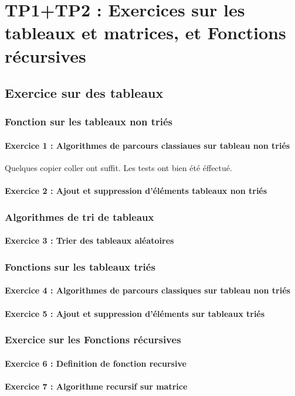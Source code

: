 \chapter{TP1+TP2 : Exercices sur les tableaux et matrices, et Fonctions récursives}
    \section{Exercice sur des tableaux}
        \subsection{Fonction sur les tableaux non triés}
            \subsubsection{Exercice 1 : Algorithmes de parcours classiaues sur tableau non triés}
	        Quelques copier coller ont suffit.
                Les tests ont bien été éffectué.
            \subsubsection{Exercice 2 : Ajout et suppression d'éléments tableaux non triés}
        \subsection{Algorithmes de tri de tableaux}
            \subsubsection{Exercice 3 : Trier des tableaux aléatoires}
        \subsection{Fonctions sur les tableaux triés}
            \subsubsection{Exercice 4 : Algorithmes de parcours classiques sur tableau non triés}
            \subsubsection{Exercice 5 : Ajout et suppression d’éléments sur tableaux triés}
        \subsection{Exercice sur les Fonctions récursives}
	    \subsubsection{Exercice 6 : Definition de fonction recursive}
	    \subsubsection{Exercice 7 : Algorithme recursif sur matrice}

